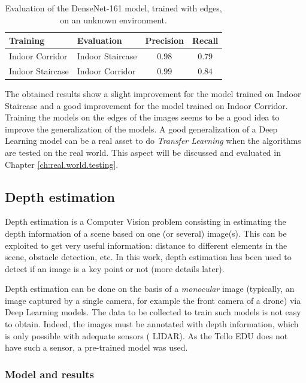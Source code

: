 \begin{table}[H]
    \centering
    \begin{tabular}{|l|l|c|c|}
        \hline
        \textbf{Training} & \textbf{Evaluation} & \textbf{Precision} & \textbf{Recall} \\ \hline
        \hline
        Indoor Corridor & Indoor Staircase & $\num{0.98}$ & $\num{0.79}$ \\ \hline
        Indoor Staircase & Indoor Corridor & $\num{0.99}$ & $\num{0.84}$ \\ \hline
    \end{tabular}
    \caption{Evaluation of the DenseNet-161 model, trained with edges, on an unknown environment.}
    \label{tab:06.classification.evaluation.generalisation.edges}
\end{table}

The obtained results show a slight improvement for the model trained on Indoor Staircase and a good improvement for the model trained on Indoor Corridor. Training the models on the edges of the images seems to be a good idea to improve the generalization of the models. A good generalization of a Deep Learning model can be a real asset to do \emph{Transfer Learning} when the algorithms are tested on the real world. This aspect will be discussed and evaluated in Chapter \ref{ch:real.world.testing}.

\subsection{Depth estimation}

Depth estimation is a Computer Vision problem consisting in estimating the depth information of a scene based on one (or several) image(s). This can be exploited to get very useful information: distance to different elements in the scene, obstacle detection, etc. In this work, depth estimation has been used to detect if an image is a key point or not (more details later).

Depth estimation can be done on the basis of a \emph{monocular} image (typically, an image captured by a single camera, for example the front camera of a drone) via Deep Learning models. The data to be collected to train such models is not easy to obtain. Indeed, the images must be annotated with depth information, which is only possible with adequate sensors (\eg{} LIDAR). As the Tello EDU does not have such a sensor, a pre-trained model was used.

\subsubsection{Model and results}

